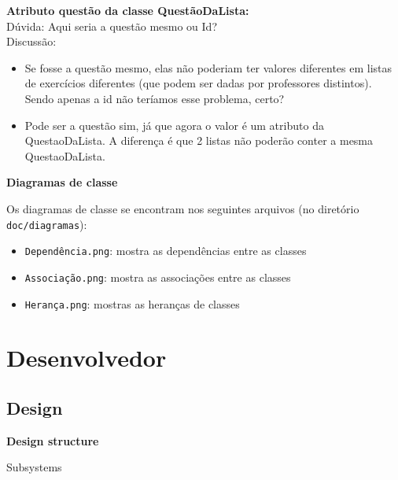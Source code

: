 \documentclass[12pt,letterpaper]{article}
\begin{document}
\textbf{Atributo questão da classe QuestãoDaLista:}\\
Dúvida: Aqui seria a questão mesmo ou Id?\\
\newline
Discussão:
\begin{itemize}
\item{}Se fosse a questão mesmo, elas não poderiam ter valores diferentes em listas de exercícios diferentes (que podem ser dadas por professores distintos). Sendo apenas a id não teríamos esse problema, certo?
\item{}Pode ser a questão sim, já que agora o valor é um atributo da QuestaoDaLista. A diferença é que 2 listas não poderão conter a mesma QuestaoDaLista.
\end{itemize}

\pagebreak

\vspace{1cm}
{\large {\bf Diagramas de classe}}
\vspace{0.5cm}

Os diagramas de classe se encontram nos seguintes arquivos (no diretório \texttt{doc/diagramas}):

\begin{itemize}
\item{}\texttt{Dependência.png}: mostra as dependências entre as classes
\item{}\texttt{Associação.png}: mostra as associações entre as classes
\item{}\texttt{Herança.png}: mostras as heranças de classes
\end{itemize}

\pagebreak

\section{Desenvolvedor}

\subsection{Design}

\vspace{1cm}
{\large {\bf Design structure}}
\vspace{0.5cm}


Subsystems
\end{document}
